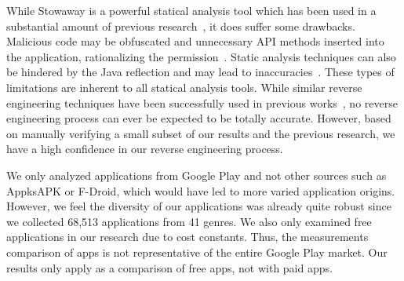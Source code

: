 While Stowaway is a powerful statical analysis tool which has been used in a substantial amount of previous research~\cite{Pearce:2012:APS:2414456.2414498,Stevens_investigatinguser,jeon2011dr}, it does suffer some drawbacks. Malicious code may be obfuscated and unnecessary API methods inserted into the application, rationalizing the permission~\cite{6698893}. Static analysis techniques can also be hindered by the Java reflection and may lead to inaccuracies~\cite{Sridharan:2006:RCP:1133255.1134027,Tripp:2009:TET:1542476.1542486}. These types of limitations are inherent to all statical analysis tools. While similar reverse engineering techniques have been successfully used in previous works~\cite{Lee_2013,6687155}, no reverse engineering process can ever be expected to be totally accurate. However, based on manually verifying a small subset of our results and the previous research, we have a high confidence in our reverse engineering process.

We only analyzed applications from Google Play and not other sources such as AppksAPK or F-Droid, which would have led to more varied application origins. However, we feel the diversity of our applications was already quite robust since we collected 68,513 applications from 41 genres. We also only examined free applications in our research due to cost constants. Thus, the measurements comparison of apps is not representative of the entire Google Play market. Our results only apply as a comparison of free apps, not with paid apps.
